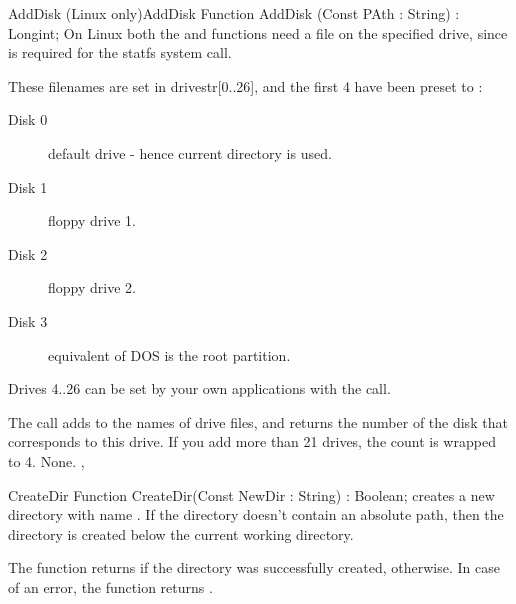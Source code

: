 \begin{functionl}{AddDisk (Linux only)}{AddDisk}
\Declaration
Function AddDisk (Const PAth : String) : Longint;
\Description
On Linux  both the  and  functions need a 
file on the specified drive, since is required for the statfs system call.

These filenames are set in drivestr[0..26], and the first 4 have been 
preset to :
\begin{description}
\item[Disk 0]   default drive - hence current directory is used.
\item[Disk 1]   floppy drive 1.
\item[Disk 2]   floppy drive 2.
\item[Disk 3]    equivalent of DOS is the root partition.
\end{description}
Drives 4..26 can be set by your own applications with the  call.

The  call adds  to the names of drive files, and
returns the number of the disk that corresponds to this drive. If you
add more than 21 drives, the count is wrapped to 4.
\Errors
None. 
\SeeAlso
{}, 
\end{functionl}

\begin{function}{CreateDir}
\Declaration
Function CreateDir(Const NewDir : String) : Boolean;
\Description
{} creates a new directory with name .
If the directory doesn't contain an absolute path, then the directory is
created below the current working directory.

The function returns  if the directory was successfully 
created,  otherwise.
\Errors
In case of an error, the function returns .
\SeeAlso
{}
\end{function}

\html{}
 
